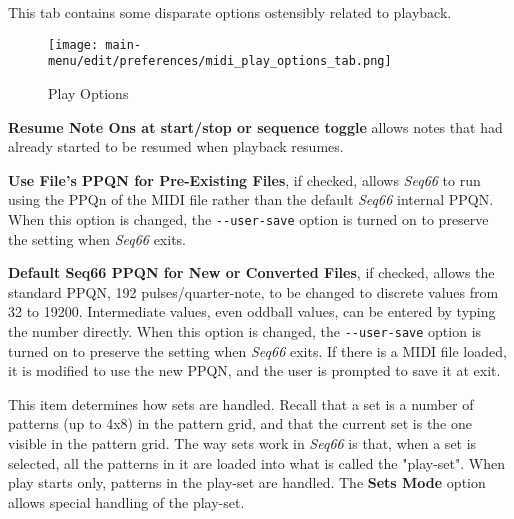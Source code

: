    This tab contains some disparate options ostensibly related to playback.

\begin{figure}[H]
   \centering 
   \texttt{[image: main-menu/edit/preferences/midi\_play\_options\_tab.png]}
   \caption{Play Options}
   \label{fig:midi_play_options_tab}
\end{figure}

   \setcounter{ItemCounter}{0}      %

   \textbf{Resume Note Ons at start/stop or sequence toggle}
   allows notes that had already started
   to be resumed when playback resumes.

   \textbf{Use File's PPQN for Pre-Existing Files}, if checked, allows
   \textsl{Seq66} to run using the PPQn of the MIDI file rather than
   the default \textsl{Seq66} internal PPQN.
   When this option is changed, the \texttt{-{}-user-save} option is turned on
   to preserve the setting when \textsl{Seq66} exits.

   \textbf{Default Seq66 PPQN for New or Converted Files}, if checked, allows
   the standard PPQN, 192 pulses/quarter-note, to be changed to discrete values
   from 32 to 19200.  Intermediate values, even oddball values, can be entered
   by typing the number directly.
   When this option is changed, the \texttt{-{}-user-save} option is turned on
   to preserve the setting when \textsl{Seq66} exits.
   If there is a MIDI file loaded, it is modified to use the new PPQN, and the
   user is prompted to save it at exit.

   This item determines how sets are handled.
   Recall that a set is a number of patterns (up to 4x8) in the pattern grid,
   and that the current set is the one visible in the pattern grid.
   The way sets work in \textsl{Seq66} is that, when a set is selected,
   all the patterns in it are loaded into what is called
   the "play-set".
   When play starts only, patterns in the play-set are handled.
   The \textbf{Sets Mode} option allows special handling of the play-set.

